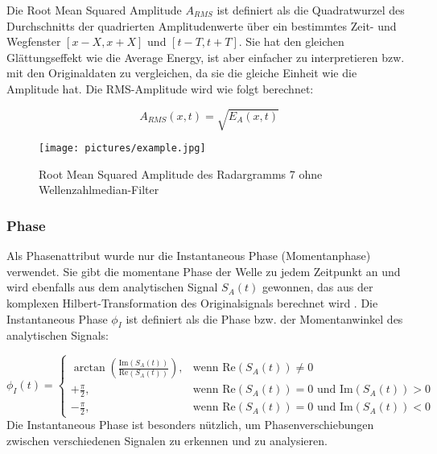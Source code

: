 Die Root Mean Squared Amplitude $A_{RMS}$ \parencites{roden_geologic_2015}{noauthor_rms_2022} ist definiert als die Quadratwurzel des Durchschnitts der quadrierten Amplitudenwerte über ein bestimmtes Zeit- und Wegfenster $\left[x-X, x+X\right]$ und $\left[t-T, t+T\right]$. Sie hat den gleichen Glättungseffekt wie die Average Energy, ist aber einfacher zu interpretieren bzw. mit den Originaldaten zu vergleichen, da sie die gleiche Einheit wie die Amplitude hat. Die RMS-Amplitude wird wie folgt berechnet:

\begin{equation}
    A_{RMS}(x,t) = \sqrt{E_A(x,t)}
\end{equation}

\begin{figure}[H]
    \centering
    \texttt{[image: pictures/example.jpg]}
    \caption{Root Mean Squared Amplitude des Radargramms 7 ohne Wellenzahlmedian-Filter}
    \label{fig:rms_amplitude}
\end{figure}

\subsubsection{Phase}

Als Phasenattribut wurde nur die Instantaneous Phase (Momentanphase) \parencite{taner_complex_1979} verwendet. Sie gibt die momentane Phase der Welle zu jedem Zeitpunkt an und wird ebenfalls aus dem analytischen Signal $S_A(t)$ gewonnen, das aus der komplexen Hilbert-Transformation des Originalsignals berechnet wird \parencite[S. 177]{sheriff_encyclopedic_2002}. Die Instantaneous Phase $\phi_I$ ist definiert als die Phase bzw. der Momentanwinkel des analytischen Signals:

\begin{equation}
    \phi_I(t) =
    \begin{cases}
        \arctan\left(\frac{\text{Im}(S_A(t))}{\text{Re}(S_A(t))}\right), & \text{wenn } \text{Re}(S_A(t)) \neq 0 \\
        +\frac{\pi}{2}, & \text{wenn } \text{Re}(S_A(t)) = 0 \text{ und } \text{Im}(S_A(t)) > 0 \\
        -\frac{\pi}{2}, & \text{wenn } \text{Re}(S_A(t)) = 0 \text{ und } \text{Im}(S_A(t)) < 0
    \end{cases}
\end{equation}
Die Instantaneous Phase ist besonders nützlich, um Phasenverschiebungen zwischen verschiedenen Signalen zu erkennen und zu analysieren.

